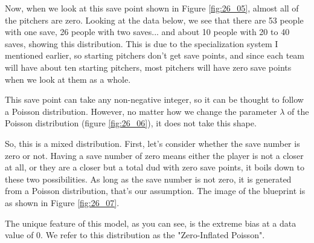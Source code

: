 \documentclass{ltjsbook}
\begin{document}
	Now, when we look at this save point shown in Figure \ref{fig:26_05}, almost all of the pitchers are zero. Looking at the data below, we see that there are 53 people with one save, 26 people with two saves... and about 10 people with 20 to 40 saves, showing this distribution. This is due to the specialization system I mentioned earlier, so starting pitchers don't get save points, and since each team will have about ten starting pitchers, most pitchers will have zero save points when we look at them as a whole.

	This save point can take any non-negative integer, so it can be thought to follow a Poisson distribution. However, no matter how we change the parameter $\lambda$ of the Poisson distribution (figure \ref{fig:26_06}), it does not take this shape.


	
	So, this is a mixed distribution. First, let's consider whether the save number is zero or not. Having a save number of zero means either the player is not a closer at all, or they are a closer but a total dud with zero save points, it boils down to these two possibilities. As long as the save number is not zero, it is generated from a Poisson distribution, that's our assumption. The image of the blueprint is as shown in Figure \ref{fig:26_07}.
	

	The unique feature of this model, as you can see, is the extreme bias at a data value of 0. We refer to this distribution as the "Zero-Inflated Poisson".
\end{document}

